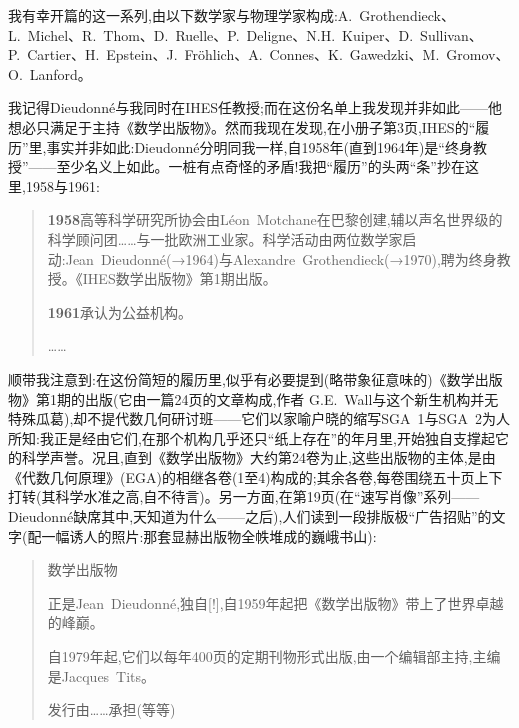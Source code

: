 我有幸开篇的这一系列,由以下数学家与物理学家构成:A.~Grothendieck、L.~Michel、R.~Thom、D.~Ruelle、P.~Deligne、N.H.~Kuiper、D.~Sullivan、P.~Cartier、H.~Epstein、J.~Fröhlich、A.~Connes、K.~Gawedzki、M.~Gromov、O.~Lanford。

我记得Dieudonné与我同时在IHES任教授;而在这份名单上我发现并非如此——他想必只满足于主持《数学出版物》。然而我现在发现,在小册子第3页,IHES的“履历”里,事实并非如此:Dieudonné分明同我一样,自1958年(直到1964年)是“终身教授”——至少名义上如此。一桩有点奇怪的矛盾!我把“履历”的头两“条”抄在这里,1958与1961:

\begin{quote}
\textbf{1958}高等科学研究所协会由Léon~Motchane在巴黎创建,辅以声名世界级的科学顾问团……与一批欧洲工业家。科学活动由两位数学家启动:Jean~Dieudonné(→1964)与Alexandre~Grothendieck(→1970),聘为终身教授。《IHES数学出版物》第1期出版。

\textbf{1961}承认为公益机构。

……
\end{quote}

顺带我注意到:在这份简短的履历里,似乎有必要提到(略带象征意味的)《数学出版物》第1期的出版(它由一篇24页的文章构成,作者 G.E.~Wall与这个新生机构并无特殊瓜葛),却不提代数几何研讨班——它们以家喻户晓的缩写SGA~1与SGA~2为人所知:我正是经由它们,在那个机构几乎还只“纸上存在”的年月里,开始独自支撑起它的科学声誉。况且,直到《数学出版物》大约第24卷为止,这些出版物的主体,是由《代数几何原理》(EGA)的相继各卷(1至4)构成的;其余各卷,每卷围绕五十页上下打转(其科学水准之高,自不待言\dmark{})。另一方面,在第19页(在“速写肖像”系列——Dieudonné缺席其中,天知道为什么——之后),人们读到一段排版极“广告招贴”的文字(配一幅诱人的照片:那套显赫出版物全帙堆成的巍峨书山):

\begin{quote}
数学出版物

正是Jean~Dieudonné,独自[!],自1959年起把《数学出版物》带上了世界卓越的峰巅。

自1979年起,它们以每年400页的定期刊物形式出版,由一个编辑部主持,主编是Jacques~Tits。

发行由……承担(等等)
\end{quote}

